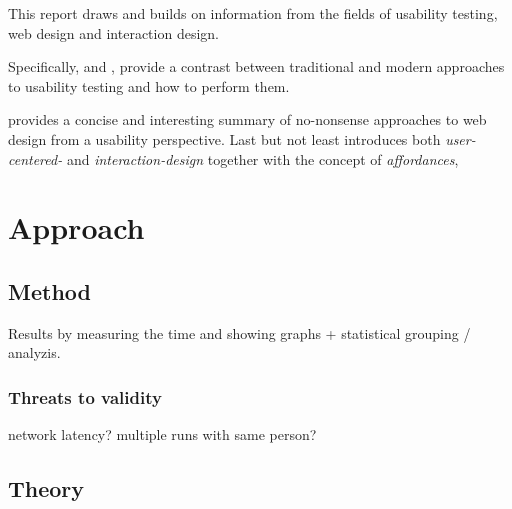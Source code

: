\documentclass[nofilelist]{cslthse-msc}
\begin{document}
		This report draws and builds on information from the fields of usability
		testing, web design and interaction design.

		Specifically,  and
		, provide a contrast between
		traditional and modern approaches to usability testing and how to perform
		them.

		 provides a concise and interesting
		summary of no-nonsense approaches to web design from a usability perspective.
		Last but not least  introduces
		both \textit{user-centered-} and \textit{interaction-design} together
		with the concept of \textit{affordances},



	\chapter{Approach}

		\section{Method}

			Results by measuring the time and showing graphs + statistical grouping /
			analyzis.

			\subsection{Threats to validity}

				network latency?
				multiple runs with same person?


		\section{Theory}
\end{document}
